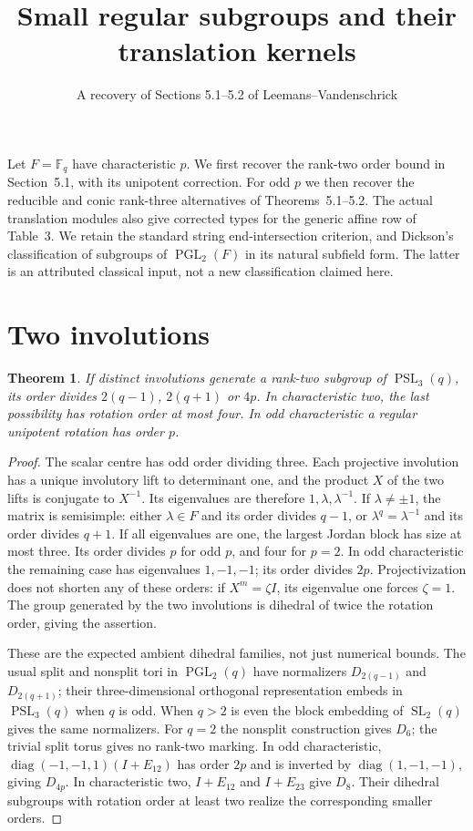 \documentclass[11pt]{article}
\title{Small regular subgroups and their translation kernels}
\author{A recovery of Sections 5.1--5.2 of Leemans--Vandenschrick}\date{}
\newtheorem{theorem}{Theorem}\newtheorem{lemma}[theorem]{Lemma}
\newcommand{\F}{\mathbb F}\newcommand{\gen}[1]{\langle#1\rangle}
\newcommand{\PSL}{\operatorname{PSL}}\newcommand{\PGL}{\operatorname{PGL}}
\begin{document}
\maketitle
Let $F=\F_q$ have characteristic $p$. We first recover the rank-two
order bound in Section~5.1, with its unipotent correction. For odd $p$
we then recover the reducible and conic rank-three alternatives of
Theorems~5.1--5.2. The actual translation modules also give corrected
types for the generic affine row of Table~3.
We retain the standard string end-intersection criterion, and Dickson's
classification of subgroups of $\PGL_2(F)$ in its natural subfield
form. The latter is an attributed classical input, not a new
classification claimed here.

\section*{Two involutions}
\begin{theorem}\label{two}
If distinct involutions generate a rank-two subgroup of $\PSL_3(q)$,
its order divides $2(q-1)$, $2(q+1)$ or $4p$. In characteristic two,
the last possibility has rotation order at most four. In odd
characteristic a regular unipotent rotation has order $p$.
\end{theorem}
\begin{proof}
The scalar centre has odd order dividing three. Each projective
involution has a unique involutory lift to determinant one, and the
product $X$ of the two lifts is conjugate to $X^{-1}$. Its eigenvalues
are therefore $1,\lambda,\lambda^{-1}$. If $\lambda\ne\pm1$, the
matrix is semisimple: either $\lambda\in F$ and its order divides
$q-1$, or $\lambda^q=\lambda^{-1}$ and its order divides $q+1$.
If all eigenvalues are one, the largest Jordan block has size at most
three. Its order divides $p$ for odd $p$, and four for $p=2$.
In odd characteristic the remaining case has eigenvalues $1,-1,-1$;
its order divides $2p$. Projectivization does not shorten any of these
orders: if $X^m=\zeta I$, its eigenvalue one forces $\zeta=1$.
The group generated by the two involutions is dihedral of twice the
rotation order, giving the assertion.

These are the expected ambient dihedral families, not just numerical
bounds. The usual split and nonsplit tori in $\PGL_2(q)$ have
normalizers $D_{2(q-1)}$ and $D_{2(q+1)}$; their three-dimensional
orthogonal representation embeds in $\PSL_3(q)$ when $q$ is odd.
When $q>2$ is even the block embedding of $\operatorname{SL}_2(q)$
gives the same normalizers. For $q=2$ the nonsplit construction gives
$D_6$; the trivial split torus gives no rank-two marking. In odd characteristic,
$\operatorname{diag}(-1,-1,1)(I+E_{12})$ has order $2p$ and is inverted
by $\operatorname{diag}(1,-1,-1)$, giving $D_{4p}$.
In characteristic two, $I+E_{12}$ and $I+E_{23}$ give $D_8$.
Their dihedral subgroups with rotation order at least two realize the
corresponding smaller orders.
\end{proof}
\end{document}
